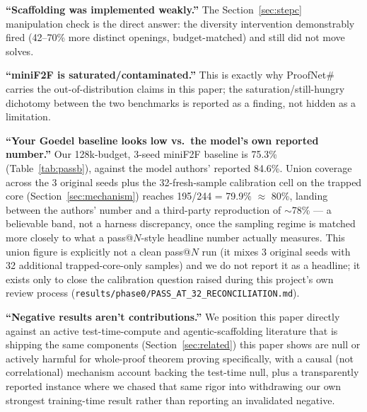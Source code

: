 \documentclass{article}
\begin{document}
\textbf{``Scaffolding was implemented weakly.''} The Section~\ref{sec:stepc} manipulation check is the
direct answer: the diversity intervention demonstrably fired (42--70\% more distinct openings,
budget-matched) and still did not move solves.

\textbf{``miniF2F is saturated/contaminated.''} This is exactly why ProofNet\# carries the
out-of-distribution claims in this paper; the saturation/still-hungry dichotomy between the two
benchmarks is reported as a finding, not hidden as a limitation.

\textbf{``Your Goedel baseline looks low vs.\ the model's own reported number.''} Our 128k-budget,
3-seed miniF2F baseline is 75.3\% (Table~\ref{tab:passb}), against the model authors' reported 84.6\%.
Union coverage across the 3 original seeds plus the 32-fresh-sample calibration cell on the trapped
core (Section~\ref{sec:mechanism}) reaches 195/244 = 79.9\% $\approx$ 80\%, landing between the
authors' number and a third-party reproduction of $\sim$78\% --- a believable band, not a harness
discrepancy, once the sampling regime is matched more closely to what a pass@$N$-style headline
number actually measures. This union figure is explicitly not a clean pass@$N$ run (it mixes 3
original seeds with 32 additional trapped-core-only samples) and we do not report it as a headline;
it exists only to close the calibration question raised during this project's own review process
(\texttt{results/phase0/PASS\_AT\_32\_RECONCILIATION.md}).

\textbf{``Negative results aren't contributions.''} We position this paper directly against an active
test-time-compute and agentic-scaffolding literature that is shipping the same components
(Section~\ref{sec:related}) this paper shows are null or actively harmful for whole-proof theorem
proving specifically, with a causal (not correlational) mechanism account backing the test-time null,
plus a transparently reported instance where we chased that same rigor into withdrawing our own
strongest training-time result rather than reporting an invalidated negative.
\end{document}
